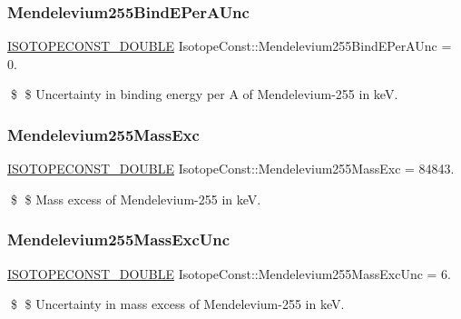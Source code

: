 \subsubsection{\texorpdfstring{Mendelevium255\+Bind\+E\+Per\+A\+Unc}{Mendelevium255BindEPerAUnc}}
{\footnotesize\ttfamily \mbox{\hyperlink{group___isotope_const-_macros_ga8f45a7272ce02c0b4c65c44636ed719a}{I\+S\+O\+T\+O\+P\+E\+C\+O\+N\+S\+T\+\_\+\+D\+O\+U\+B\+LE}} Isotope\+Const\+::\+Mendelevium255\+Bind\+E\+Per\+A\+Unc = 0.}

\$ \$ Uncertainty in binding energy per A of Mendelevium-\/255 in keV. \mbox{\label{group___isotope_const-_mendelevium-_md255_ga456f248deaf28314aa356d7356ebdfa6}} 
\subsubsection{\texorpdfstring{Mendelevium255\+Mass\+Exc}{Mendelevium255MassExc}}
{\footnotesize\ttfamily \mbox{\hyperlink{group___isotope_const-_macros_ga8f45a7272ce02c0b4c65c44636ed719a}{I\+S\+O\+T\+O\+P\+E\+C\+O\+N\+S\+T\+\_\+\+D\+O\+U\+B\+LE}} Isotope\+Const\+::\+Mendelevium255\+Mass\+Exc = 84843.}

\$ \$ Mass excess of Mendelevium-\/255 in keV. \mbox{\label{group___isotope_const-_mendelevium-_md255_gad11ae4d36e0a09ac7a4faccee3bb7f30}} 
\subsubsection{\texorpdfstring{Mendelevium255\+Mass\+Exc\+Unc}{Mendelevium255MassExcUnc}}
{\footnotesize\ttfamily \mbox{\hyperlink{group___isotope_const-_macros_ga8f45a7272ce02c0b4c65c44636ed719a}{I\+S\+O\+T\+O\+P\+E\+C\+O\+N\+S\+T\+\_\+\+D\+O\+U\+B\+LE}} Isotope\+Const\+::\+Mendelevium255\+Mass\+Exc\+Unc = 6.}

\$ \$ Uncertainty in mass excess of Mendelevium-\/255 in keV. \mbox{\label{group___isotope_const-_mendelevium-_md255_ga99e72555f60b70fd3587c8f97a87fd8b}} 
